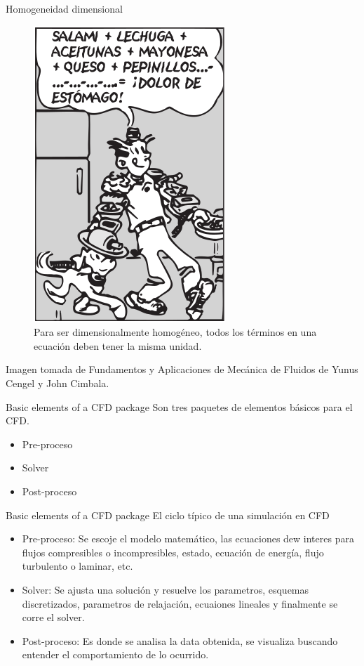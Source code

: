 \begin{frame}{Homogeneidad dimensional}
\justifying
\begin{figure}[H]
\centering
\includegraphics[scale=0.25]{Section_Files/imagenes/sec01_0101_Fig01-35.png}
\caption{Para ser dimensionalmente homogéneo, todos los términos en una ecuación deben tener la misma unidad.}
\label{fig: Figura1-35}
\end{figure}
Imagen tomada de Fundamentos y Aplicaciones de Mecánica de Fluidos de Yunus Cengel y John Cimbala.
\end{frame}




\begin{frame}{Basic elements of a CFD package}
\justifying
Son tres paquetes de elementos básicos para el CFD.
\begin{itemize}
\item Pre-proceso
\item Solver
\item Post-proceso
\end{itemize}
\end{frame}
	
\begin{frame}{Basic elements of a CFD package}
\justifying
El ciclo típico de una simulación en CFD
\begin{itemize}
\item Pre-proceso: Se escoje el modelo matemático, las ecuaciones dew interes para flujos compresibles o incompresibles, estado, ecuación de energía, flujo turbulento o laminar, etc.
\item Solver: Se ajusta una solución y resuelve los parametros, esquemas discretizados, parametros de relajación, ecuaiones lineales y finalmente se corre el solver.
\item Post-proceso: Es donde se analisa la data obtenida, se visualiza buscando entender el comportamiento de lo ocurrido.
\end{itemize}
\end{frame}